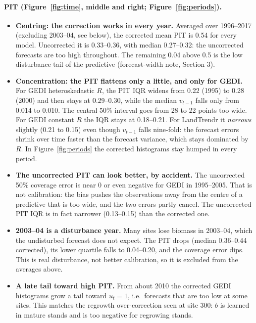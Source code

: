 \documentclass[11pt]{article}
\begin{document}
\paragraph{PIT (Figure~\ref{fig:time}, middle and right; Figure~\ref{fig:periods}).}
\begin{itemize}
  \item \textbf{Centring: the correction works in every year.} Averaged over 1996--2017
  (excluding 2003--04, see below), the corrected mean PIT is 0.54 for every model.
  Uncorrected it is 0.33--0.36, with median 0.27--0.32: the uncorrected forecasts are too high
  throughout. The remaining 0.04 above 0.5 is the low disturbance tail of the predictive
  (forecast-width note, Section 3).
  \item \textbf{Concentration: the PIT flattens only a little, and only for GEDI.} For GEDI heteroskedastic $R$,
  the PIT IQR widens from 0.22 (1995) to 0.28 (2000) and then stays at 0.29--0.30, while
  the median $v_{t-1}$ falls only from 0.014 to 0.010. The central 50\% interval goes from 28 to 22
  points too wide. For GEDI constant $R$ the IQR stays at 0.18--0.21. For LandTrendr it
  \emph{narrows} slightly (0.21 to 0.15) even though $v_{t-1}$ falls nine-fold: the forecast
  errors shrink over time faster than the forecast variance, which stays dominated by $R$. In
  Figure~\ref{fig:periods} the corrected histograms stay humped in every period.
  \item \textbf{The uncorrected PIT can look better, by accident.} The uncorrected 50\% coverage error is near 0 or
  even negative for GEDI in 1995--2005. That is not calibration: the bias pushes the
  observations away from the centre of a predictive that is too wide, and the two errors partly cancel.
  The uncorrected PIT IQR is in fact narrower (0.13--0.15) than the corrected one.
  \item \textbf{2003--04 is a disturbance year.} Many sites lose biomass in 2003--04, which
  the undisturbed forecast does not expect. The PIT drops (median 0.36--0.44 corrected), its
  lower quartile falls to 0.04--0.20, and the coverage error dips. This is real disturbance,
  not better calibration, so it is excluded from the averages above.
  \item \textbf{A late tail toward high PIT.} From about 2010 the corrected GEDI histograms grow a tail toward
  $u_t = 1$, i.e.\ forecasts that are too low at some sites. This matches the regrowth
  over-correction seen at site 300: $b$ is learned in mature stands and is too negative for
  regrowing stands.
\end{itemize}
\end{document}
